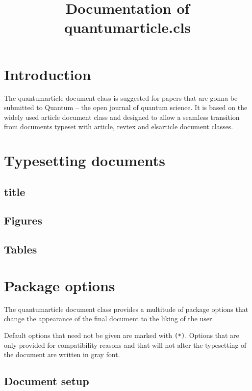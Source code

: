 \documentclass[a4paper,noarxiv,onecolumn]{quantumarticle}
\begin{document}
	\title{Documentation of quantumarticle.cls}
	\maketitle
	
	\tableofcontents
	
	\clearpage
	
	\section{Introduction}
	The quantumarticle document class is suggested for papers that are gonna be submitted to Quantum -- the open journal of quantum science. It is based on the widely used article document class and designed to allow a seamless transition from documents typeset with article, revtex and elsarticle document classes. 
	
	\section{Typesetting documents}
	
	\subsection{title}
	
	\subsection{Figures}
	
	\subsection{Tables}
	
	\section{Package options}
	The quantumarticle document class provides a multitude of package options that change the appearance of the final document to the liking of the user. 
	
	Default options that need not be given are marked with \texttt{(*)}. Options that are only provided for compatibility reasons and that will not alter the typesetting of the document are written in gray font.
	
	\subsection{Document setup}
	
\end{document}
